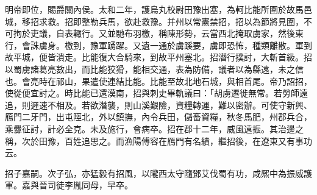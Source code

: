 \begin{pinyinscope}
 
 
 
 明帝即位，賜爵關內侯。太和二年，護烏丸校尉田豫出塞，為軻比能所圍於故馬邑城，移招求救。招即整勒兵馬，欲赴救豫。并州以常憲禁招，招以為節將見圍，不可拘於吏議，自表輙行。又並馳布羽檄，稱陳形勢，云當西北掩取虜家，然後東行，會誅虜身。檄到，豫軍踴躍。又遺一通於虜蹊要，虜即恐怖，種類離散。軍到故平城，便皆潰走。比能復大合騎來，到故平州塞北。招潛行撲討，大斬首級。招以蜀虜諸葛亮數出，而比能狡猾，能相交通，表為防備，議者以為縣遠，未之信也。會亮時在祁山，果遣使連結比能。比能至故北地石城，與相首尾。帝乃詔招，使從便宜討之。時比能已還漠南，招與刺史畢軌議曰：「胡虜遷徙無常。若勞師遠追，則遲速不相及。若欲潛襲，則山溪艱險，資糧轉運，難以密辦。可使守新興、鴈門二牙門，出屯陘北，外以鎮撫，內令兵田，儲畜資糧，秋冬馬肥，州郡兵合，乘釁征討，計必全克。未及施行，會病卒。招在郡十二年，威風遠振。其治邊之稱，次於田豫，百姓追思之。而漁陽傅容在鴈門有名績，繼招後，在遼東又有事功云。
 
 
 
 
 招子嘉嗣。次子弘，亦猛毅有招風，以隴西太守隨鄧艾伐蜀有功，咸熈中為振威護軍。嘉與晉司徒李胤同母，早卒。
 
 
 
 
\end{pinyinscope}